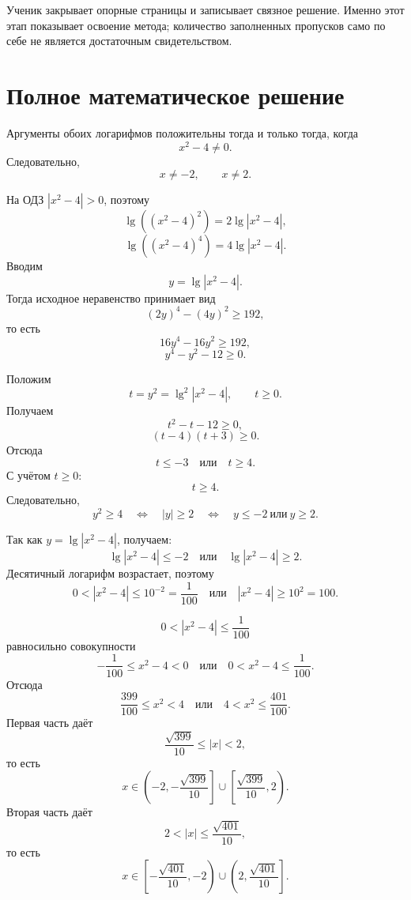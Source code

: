 \begin{teacherbox}
  Ученик закрывает опорные страницы и записывает связное решение. Именно этот
  этап показывает освоение метода; количество заполненных пропусков само по
  себе не является достаточным свидетельством.
\end{teacherbox}

\section{Полное математическое решение}


Аргументы обоих логарифмов положительны тогда и только тогда, когда
\[
  x^2-4\ne0.
\]
Следовательно,
\[
  x\ne-2,
  \qquad
  x\ne2.
\]


На ОДЗ \(|x^2-4|>0\), поэтому
\[
  \lg((x^2-4)^2)=2\lg|x^2-4|,
\]
\[
  \lg((x^2-4)^4)=4\lg|x^2-4|.
\]
Вводим
\[
  y=\lg|x^2-4|.
\]
Тогда исходное неравенство принимает вид
\[
  (2y)^4-(4y)^2\ge192,
\]
то есть
\[
  16y^4-16y^2\ge192,
\]
\[
  y^4-y^2-12\ge0.
\]


Положим
\[
  t=y^2=\lg^2|x^2-4|,
  \qquad t\ge0.
\]
Получаем
\[
  t^2-t-12\ge0,
\]
\[
  (t-4)(t+3)\ge0.
\]
Отсюда
\[
  t\le-3
  \quad\text{или}\quad
  t\ge4.
\]
С учётом \(t\ge0\):
\[
  t\ge4.
\]
Следовательно,
\[
  y^2\ge4
  \quad\Longleftrightarrow\quad
  |y|\ge2
  \quad\Longleftrightarrow\quad
  y\le-2\ \text{или}\ y\ge2.
\]


Так как \(y=\lg|x^2-4|\), получаем:
\[
  \lg|x^2-4|\le-2
  \quad\text{или}\quad
  \lg|x^2-4|\ge2.
\]
Десятичный логарифм возрастает, поэтому
\[
  0<|x^2-4|\le10^{-2}=\frac1{100}
  \quad\text{или}\quad
  |x^2-4|\ge10^2=100.
\]

\argregimesteacherfigure


\[
  0<|x^2-4|\le\frac1{100}
\]
равносильно совокупности
\[
  -\frac1{100}\le x^2-4<0
  \quad\text{или}\quad
  0<x^2-4\le\frac1{100}.
\]
Отсюда
\[
  \frac{399}{100}\le x^2<4
  \quad\text{или}\quad
  4<x^2\le\frac{401}{100}.
\]
Первая часть даёт
\[
  \frac{\sqrt{399}}{10}\le|x|<2,
\]
то есть
\[
  x\in
  \left(-2,-\frac{\sqrt{399}}{10}\right]
  \cup
  \left[\frac{\sqrt{399}}{10},2\right).
\]
Вторая часть даёт
\[
  2<|x|\le\frac{\sqrt{401}}{10},
\]
то есть
\[
  x\in
  \left[-\frac{\sqrt{401}}{10},-2\right)
  \cup
  \left(2,\frac{\sqrt{401}}{10}\right].
\]


